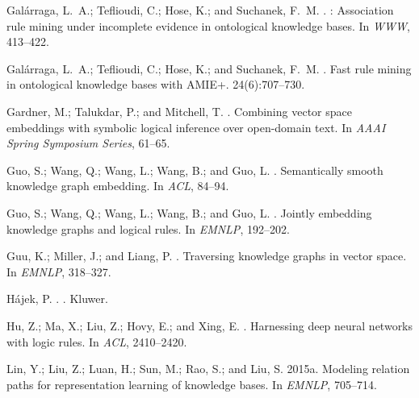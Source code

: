 \documentclass[letterpaper]{article} \usepackage{aaai18}  \usepackage{times}  \usepackage{helvet}  \usepackage{courier}  \usepackage{url}  \usepackage{graphicx}  \usepackage{amsmath}
\begin{document}
\begin{thebibliography}{}
Gal{\'a}rraga, L.~A.; Teflioudi, C.; Hose, K.; and Suchanek, F.~M.
.
: Association rule mining under incomplete evidence in
  ontological knowledge bases.
\newblock In {\em WWW},  413--422.

Gal{\'a}rraga, L.~A.; Teflioudi, C.; Hose, K.; and Suchanek, F.~M.
.
\newblock Fast rule mining in ontological knowledge bases with {AMIE+}.
 24(6):707--730.

Gardner, M.; Talukdar, P.; and Mitchell, T.
.
\newblock Combining vector space embeddings with symbolic logical inference
  over open-domain text.
\newblock In {\em AAAI Spring Symposium Series},  61--65.

Guo, S.; Wang, Q.; Wang, L.; Wang, B.; and Guo, L.
.
\newblock Semantically smooth knowledge graph embedding.
\newblock In {\em ACL},  84--94.

Guo, S.; Wang, Q.; Wang, L.; Wang, B.; and Guo, L.
.
\newblock Jointly embedding knowledge graphs and logical rules.
\newblock In {\em EMNLP},  192--202.

Guu, K.; Miller, J.; and Liang, P.
.
\newblock Traversing knowledge graphs in vector space.
\newblock In {\em EMNLP},  318--327.

H{\'a}jek, P.
.
.
\newblock Kluwer.

Hu, Z.; Ma, X.; Liu, Z.; Hovy, E.; and Xing, E.
.
\newblock Harnessing deep neural networks with logic rules.
\newblock In {\em ACL},  2410--2420.

Lin, Y.; Liu, Z.; Luan, H.; Sun, M.; Rao, S.; and Liu, S.
\newblock 2015a.
\newblock Modeling relation paths for representation learning of knowledge
  bases.
\newblock In {\em EMNLP},  705--714.


\end{thebibliography}
\end{document}
